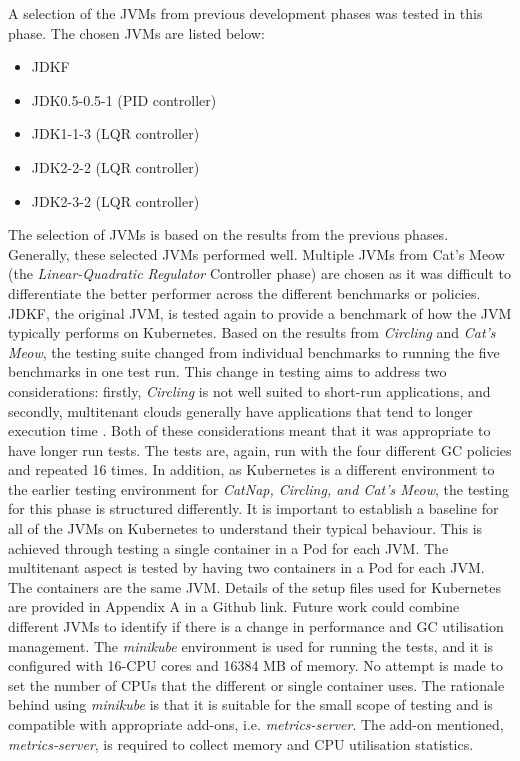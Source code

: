 A selection of the JVMs from previous development phases was tested
in this phase. The chosen JVMs are listed below:
\begin{itemize}
\item
  JDKF
\item
  JDK0.5-0.5-1 (PID controller)
\item
  JDK1-1-3 (LQR controller)
\item
 JDK2-2-2 (LQR controller)

\item
  JDK2-3-2 (LQR controller)

\end{itemize}
The selection of JVMs is based on the results from the previous
phases. Generally, these selected JVMs performed well. Multiple JVMs
from Cat's Meow (the \emph{Linear-Quadratic Regulator} Controller phase) are
chosen as it was difficult to differentiate the better performer across
the different benchmarks or policies. JDKF, the original JVM, is tested
again to provide a benchmark of how the JVM typically performs on
Kubernetes.
\newline\newline
Based on the results from \emph{Circling} and \emph{Cat's Meow}, the testing suite
changed from individual benchmarks to running the five benchmarks in one
test run. This change in testing aims to address two considerations:
firstly, \emph{Circling} is not well suited to short-run applications, and
secondly, multitenant clouds generally have applications that tend to
longer execution time \cite{shen2011cloudscale}. Both of these
considerations meant that it was appropriate to have longer run tests.
The tests are, again, run with the four different GC policies and
repeated 16 times.
\newline\newline
In addition, as Kubernetes is a different environment to the earlier
testing environment for \emph{CatNap, Circling, and Cat's Meow}, the
testing for this phase is structured differently. It is
important to establish a baseline for all of the JVMs on Kubernetes to
understand their typical behaviour. This is achieved through testing a
single container in a Pod for each JVM. The multitenant aspect is tested
by having two containers in a Pod for each JVM. The containers are the
same JVM. Details of the setup files used for Kubernetes are provided in
Appendix A in a Github link. Future work could combine different JVMs to
identify if there is a change in performance and GC utilisation
management.
\newline\newline
The \emph{minikube} environment is used for running the tests, and it is
configured with 16-CPU cores and 16384 MB of memory. No attempt is made
to set the number of CPUs that the different or single container uses.
The rationale behind using \emph{minikube} is that it is suitable for the small
scope of testing and is compatible with appropriate add-ons, i.e.
\emph{metrics-server}. The add-on mentioned, \emph{metrics-server}, is required to
collect memory and CPU utilisation statistics.
